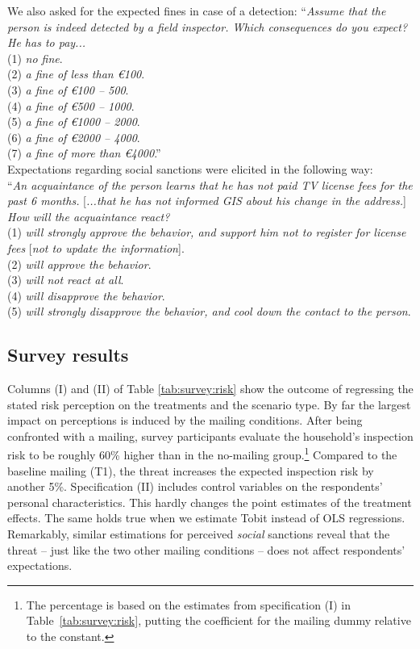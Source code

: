 \documentclass[preprint,inputenc=ansinew,doublespace,notheorems,wider]{jeea}
\begin{document}
\normalsize{We also asked for the expected fines in case of a detection: ``\textit{Assume that the person is indeed detected by a field inspector. Which  consequences do you expect? He has to pay...}\\
 \small{ (1) \textit{no fine}.\\
 (2) \textit{a fine of less than \euro 100}.\\
 (3) \textit{a fine of \euro 100 -- 500}.\\
 (4) \textit{a fine of \euro 500 -- 1000}.\\
 (5) \textit{a fine of \euro 1000 -- 2000}.\\
 (6) \textit{a fine of \euro 2000 -- 4000}.\\
 (7) \textit{a fine of more than \euro 4000}.''}\smallskip \\

\clearpage
\noindent \normalsize{Expectations regarding social sanctions were elicited in the following way:} \\
\small{``\textit{An acquaintance of the person learns that he has not paid TV license fees for the past 6 months.} [\textit{...that he has not informed GIS about his change in the address.}] \textit{How will the acquaintance react?}\\
 (1) \textit{will strongly approve the behavior, and support him not to register for license fees} [\textit{not to update the information}].\\
 (2) \textit{will approve the behavior}.\\
 (3) \textit{will not react at all}.\\
 (4) \textit{will disapprove the behavior}.\\
 (5) \textit{will strongly disapprove the behavior, and cool down the contact to the person}.}

\subsection{Survey results}

\normalsize{Columns (I) and (II) of Table \ref{tab:survey:risk} show the outcome of regressing the stated risk perception on the treatments and the scenario type. By far the largest impact on perceptions is induced by the mailing conditions. After being confronted with a mailing, survey participants evaluate the household's inspection risk to be roughly 60\% higher than in the no-mailing group.\footnote{The percentage is based on the estimates from specification (I) in Table~\ref{tab:survey:risk}, putting the coefficient for the mailing dummy relative to the constant.} Compared to the baseline mailing (T1), the threat increases the expected inspection risk by another 5\%. Specification (II) includes control variables on the respondents' personal characteristics. This hardly changes the point estimates of the treatment effects. The same holds true when we estimate Tobit instead of OLS regressions. Remarkably, similar estimations for perceived \emph{social} sanctions reveal that the threat -- just like the two other mailing conditions -- does not affect respondents' expectations.} %

}
\end{document}
